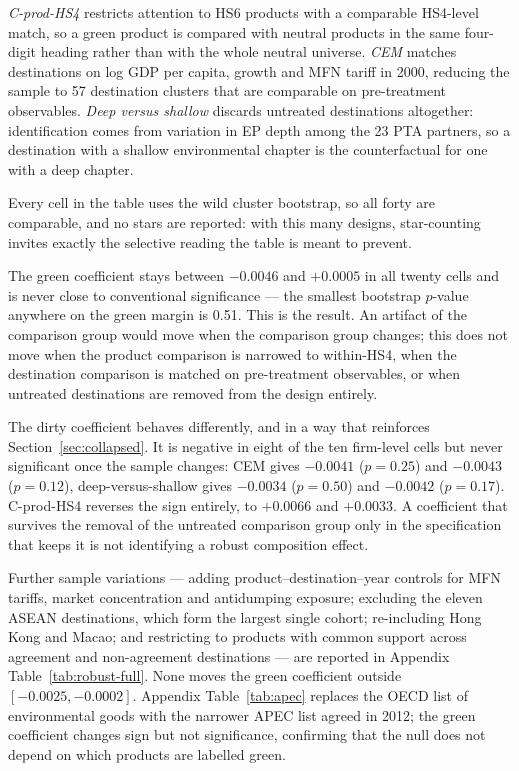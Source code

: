 \documentclass[11pt]{article}
\begin{document}
\emph{C-prod-HS4} restricts attention to HS6 products with a comparable HS4-level match, so a green
product is compared with neutral products in the same four-digit heading rather than with the whole
neutral universe. \emph{CEM} matches destinations on log GDP per capita, growth and MFN tariff in
2000, reducing the sample to 57 destination clusters that are comparable on pre-treatment
observables. \emph{Deep versus shallow} discards untreated destinations altogether: identification
comes from variation in EP depth among the 23 PTA partners, so a destination with a shallow
environmental chapter is the counterfactual for one with a deep chapter.

Every cell in the table uses the wild cluster bootstrap, so all forty are comparable, and no stars
are reported: with this many designs, star-counting invites exactly the selective reading the table
is meant to prevent.

The green coefficient stays between $-0.0046$ and $+0.0005$ in all twenty cells and is never close
to conventional significance --- the smallest bootstrap $p$-value anywhere on the green margin is
0.51. This is the result. An artifact of the comparison group would move when the comparison group
changes; this does not move when the product comparison is narrowed to within-HS4, when the
destination comparison is matched on pre-treatment observables, or when untreated destinations are
removed from the design entirely.

The dirty coefficient behaves differently, and in a way that reinforces
Section~\ref{sec:collapsed}. It is negative in eight of the ten firm-level cells but never
significant once the sample changes: CEM gives $-0.0041$ ($p = 0.25$) and $-0.0043$ ($p = 0.12$),
deep-versus-shallow gives $-0.0034$ ($p = 0.50$) and $-0.0042$ ($p = 0.17$). C-prod-HS4 reverses
the sign entirely, to $+0.0066$ and $+0.0033$. A coefficient that survives the removal of the
untreated comparison group only in the specification that keeps it is not identifying a robust
composition effect.



Further sample variations --- adding product--destination--year controls for MFN tariffs, market
concentration and antidumping exposure; excluding the eleven ASEAN destinations, which form the
largest single cohort; re-including Hong Kong and Macao; and restricting to products with common
support across agreement and non-agreement destinations --- are reported in Appendix
Table~\ref{tab:robust-full}. None moves the green coefficient outside $[-0.0025, -0.0002]$.
Appendix Table~\ref{tab:apec} replaces the OECD list of environmental goods with the narrower APEC
list agreed in 2012; the green coefficient changes sign but not significance, confirming that the
null does not depend on which products are labelled green.
\end{document}
